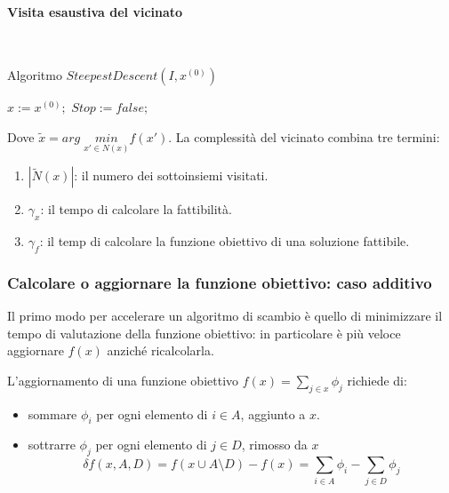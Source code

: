 \documentclass{article}
\begin{document}
\paragraph{Visita esaustiva del vicinato}\mbox{}\\
\begin{algorithm}[H]
    \caption{Algoritmo $SteepestDescent(I,x^{(0)})$}
    \label{alg:steepest_des2}
    \begin{algorithmic}
        \State $x:=x^{(0)};$
        \State $Stop := false;$
                    \EndIf
                \EndIf
            \EndFor
            \Else
            \EndIf
        \EndWhile
    \end{algorithmic}
\end{algorithm}
Dove $\tilde{x}=arg\;\underset{x'\in N(x)}{min}f(x')$. La complessità del vicinato combina
tre termini:
\begin{enumerate}
    \item $|\tilde{N}(x)|$: il numero dei sottoinsiemi visitati.
    \item $\gamma_x$: il tempo di calcolare la fattibilità.
    \item $\gamma_f$: il temp di calcolare la funzione obiettivo di una soluzione fattibile.
\end{enumerate}

\subsubsection{Calcolare o aggiornare la funzione obiettivo: caso additivo}
Il primo modo per accelerare un algoritmo di scambio è quello di minimizzare il tempo di valutazione
della funzione obiettivo: in particolare è più veloce aggiornare $f(x)$ anziché ricalcolarla.

L'aggiornamento di una funzione obiettivo $f(x)=\sum_{j\in x}\phi_j$ richiede di:
\begin{itemize}
    \item sommare $\phi_i$ per ogni elemento di $i\in A$, aggiunto a $x$.
    \item sottrarre $\phi_j$ per ogni elemento di $j\in D$, rimosso da $x$
    $$\delta f(x,A,D)=f(x\cup A\setminus D)-f(x)=\sum_{i\in A}\phi_i-\sum_{j\in D}\phi_j$$
\end{itemize}
\end{document}
